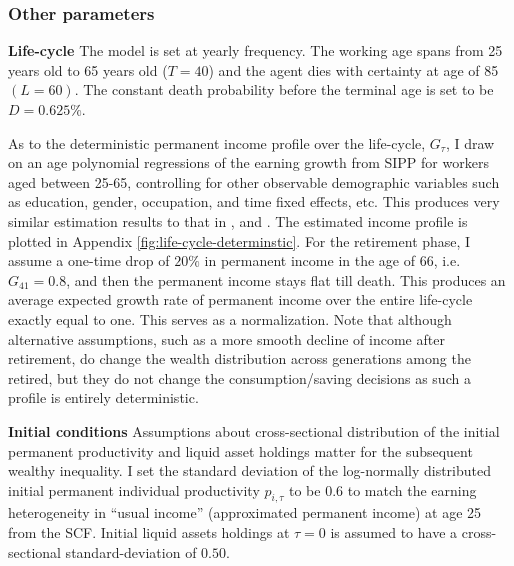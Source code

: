 \subsubsection{Other parameters}


\textbf{Life-cycle} The model is set at yearly frequency. The working age spans from 25 years old to 65 years old ($T=40$) and the agent dies with certainty at age of 85 $(L=60)$. The constant death probability before the terminal age is set to be $D=0.625\%$. 


As to the deterministic permanent income profile over the life-cycle, $G_\tau$, I draw on an age polynomial regressions of the earning growth from SIPP for workers aged between 25-65, controlling
for other observable demographic variables such as education, gender, occupation, and time fixed effects, etc. This produces very similar estimation results to that in \cite{gourinchas2002consumption}, \cite{cagetti2003wealth} and \cite{kaplan2014model}. The estimated income profile is plotted in Appendix \ref{fig:life-cycle-determinstic}. For the retirement phase, I assume a one-time drop of $20\%$ in permanent income in the age of $66$, i.e. $G_{41}=0.8$, and then the permanent income stays flat till death. This produces an average expected growth rate of permanent income over the entire life-cycle exactly equal to one. This serves as a normalization. Note that although alternative assumptions, such as a more smooth decline of income after retirement, do change the wealth distribution across generations among the retired, but they do not change the consumption/saving decisions as such a profile is entirely deterministic. 

\textbf{Initial conditions} Assumptions about cross-sectional distribution of the initial permanent productivity and liquid asset holdings matter for the subsequent wealthy inequality. I set the standard deviation of the log-normally distributed initial permanent individual productivity $p_{i,\tau}$ to be $0.6$ to match the earning heterogeneity in ``usual income'' (approximated permanent income) at age 25 from the SCF. Initial liquid assets holdings at $\tau=0$ is assumed to have a cross-sectional standard-deviation of $0.50$. %

